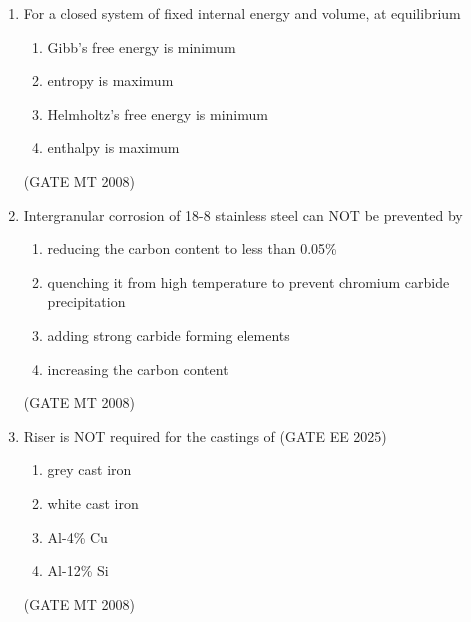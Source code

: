 \documentclass[11pt, letterpaper]{article}
\theoremstyle{remark}
\begin{document}
\begin{enumerate}[label=Q.\arabic*]
\item For a closed system of fixed internal energy and volume, at equilibrium
\vspace{-0.9em}
\begin{multicols}{2}
      \begin{enumerate}[label=(\MakeUppercase{\alph*})]
        \item Gibb's free energy is minimum
        \item entropy is maximum
        \item Helmholtz's free energy is minimum
        \item enthalpy is maximum
      \end{enumerate}
    \end{multicols}
\vspace{-5mm}
\hfill(GATE MT 2008)

\item Intergranular corrosion of 18-8 stainless steel can NOT be prevented by
\vspace{-0.9em}
\begin{multicols}{1}
 \begin{enumerate}[label=(\MakeUppercase{\alph*})]
  \item reducing the carbon content to less than 0.05\%
  \item quenching it from high temperature to prevent chromium carbide precipitation 
  \item adding strong carbide forming elements
  \item increasing the carbon content
 \end{enumerate}
\end{multicols}
\vspace{-5mm}
\hfill(GATE MT 2008)

\item Riser is NOT required for the castings of \hfill (GATE EE 2025)
\vspace{-0.9em}
\begin{multicols}{4}
 \begin{enumerate}[label=(\MakeUppercase{\alph*})]
  \item grey cast iron
  \item white cast iron 
  \item Al-4\% Cu
  \item Al-12\% Si
 \end{enumerate}
\end{multicols}
\vspace{-5mm}
\hfill(GATE MT 2008)


\end{enumerate}
\end{document}
